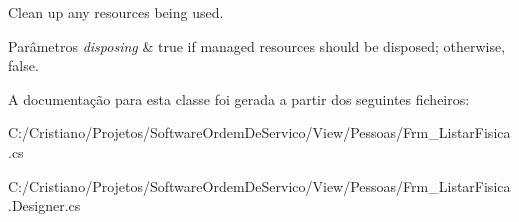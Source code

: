 Clean up any resources being used. 


\begin{DoxyParams}{Parâmetros}
{\em disposing} & true if managed resources should be disposed; otherwise, false.\\
\hline
\end{DoxyParams}


A documentação para esta classe foi gerada a partir dos seguintes ficheiros\+:\begin{DoxyCompactItemize}
\item 
C\+:/\+Cristiano/\+Projetos/\+Software\+Ordem\+De\+Servico/\+View/\+Pessoas/Frm\+\_\+\+Listar\+Fisica.\+cs\item 
C\+:/\+Cristiano/\+Projetos/\+Software\+Ordem\+De\+Servico/\+View/\+Pessoas/Frm\+\_\+\+Listar\+Fisica.\+Designer.\+cs\end{DoxyCompactItemize}
